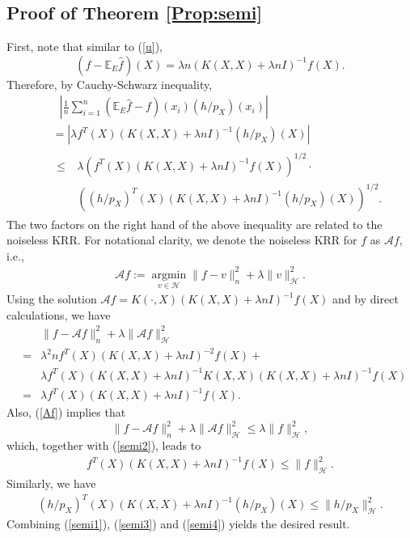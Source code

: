\documentclass[12pt]{article}
\theoremstyle{plain}
\theoremstyle{remark}
\begin{document}
\subsection{Proof of Theorem \ref{Prop:semi}} \label{sub:semipar}

First, note that similar to (\ref{u}),
\[(f-\mathbb{E}_E\hat{f})(X)=\lambda n (K(X,X)+\lambda n I)^{-1}f(X).\]
Therefore, by Cauchy-Schwarz inequality,
\begin{eqnarray}
    &&~~~\left|\frac{1}{n}\sum_{i=1}^n (\mathbb{E}_E \hat{f}-f)(x_i)(h/p_X)(x_i)\right|\nonumber\\
    &&=\left|\lambda  f^T(X)(K(X,X)+\lambda n I)^{-1}(h/p_X)(X)\right|\nonumber\\
    &&\begin{aligned}
        \leq~&\lambda \left(f^T(X)(K(X,X)+\lambda n I)^{-1}f(X)\right)^{1/2}\cdot\\&\left((h/p_X)^T(X)(K(X,X)+\lambda n I)^{-1}(h/p_X)(X)\right)^{1/2}.
    \end{aligned}
    \label{semi1}
\end{eqnarray}
The two factors on the right hand of the above inequality are related to the noiseless KRR. For notational clarity, we denote the noiseless KRR for $f$ as $\mathscr{A}f$, i.e.,
\begin{eqnarray}\label{Af}
    \mathscr{A}f:=\operatorname*{argmin}_{v\in\mathcal{H}}\|f-v\|_n^2+\lambda\|v\|^2_\mathcal{H}.
\end{eqnarray}
Using the solution $\mathscr{A}f=K(\cdot,X)(K(X,X)+\lambda n I)^{-1} f(X)$ and by direct calculations, we have
\begin{eqnarray}
    &&\|f-\mathscr{A}f\|_n^2+\lambda\|\mathscr{A}f\|^2_\mathcal{H}\nonumber\\
    &=&\lambda^2nf^T(X)(K(X,X)+\lambda n I)^{-2}f(X)+\nonumber\\
    &&\lambda f^T(X)(K(X,X)+\lambda n I)^{-1}K(X,X)(K(X,X)+\lambda n I)^{-1}f(X)\nonumber\\
    &=&\lambda f^T(X)(K(X,X)+\lambda n I)^{-1}f(X).\label{semi2}
\end{eqnarray}
Also, (\ref{Af}) implies that
\[\|f-\mathscr{A}f\|_n^2+\lambda\|\mathscr{A}f\|^2_\mathcal{H}\leq \lambda\|f\|^2_\mathcal{H},\]
which, together with (\ref{semi2}), leads to 
\begin{eqnarray}\label{semi3}
    f^T(X)(K(X,X)+\lambda n I)^{-1}f(X)\leq \|f\|^2_\mathcal{H}.
\end{eqnarray}
Similarly, we have
\begin{eqnarray}\label{semi4}
    (h/p_X)^T(X)(K(X,X)+\lambda n I)^{-1}(h/p_X)(X)\leq \|h/p_X\|^2_\mathcal{H}.
\end{eqnarray}
Combining (\ref{semi1}), (\ref{semi3}) and (\ref{semi4}) yields the desired result.
\end{document}
